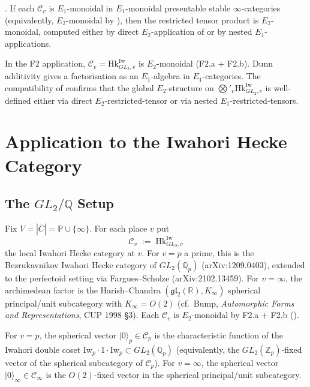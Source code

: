 \begin{corollary}[special case: \(E_{1}\otimes E_{1}=E_{2}\)]
\label{v4-arith:tate:cor:dunn-E1-E2}
\ClaimStatusProvedHere. If each \(\mathcal{C}_{v}\) is
\(E_{1}\)-monoidal in \(E_{1}\)-monoidal presentable stable
\(\infty\)-categories (equivalently,
\(E_{2}\)-monoidal by
), then the restricted
tensor product is \(E_{2}\)-monoidal, computed either by direct
\(E_{2}\)-application of  or by
nested \(E_{1}\)-applications.
\end{corollary}

\begin{remark}
\label{v4-arith:tate:rem:dunn-F2-role}
In the F2 application,
\(\mathcal{C}_{v}=\mathrm{Hk}^{\mathrm{Iw}}_{GL_{2},v}\) is
\(E_{2}\)-monoidal (F2.a + F2.b). Dunn additivity gives a
factorisation as an \(E_{1}\)-algebra in \(E_{1}\)-categories. The
compatibility of  confirms
that the global \(E_{2}\)-structure on
\(\bigotimes'_{v}\mathrm{Hk}^{\mathrm{Iw}}_{GL_{2},v}\) is
well-defined either via direct \(E_{2}\)-restricted-tensor or via
nested \(E_{1}\)-restricted-tensors.
\end{remark}

\section{Application to the Iwahori Hecke Category}
\label{v4-arith:tate:iwahori-application}

\subsection{The \(GL_{2}/\mathbb{Q}\) Setup}

\begin{setup}
\label{v4-arith:tate:setup:iwahori-Hecke-data}
Fix \(V=|\overline{C}|=\mathbb{P}\cup\{\infty\}\). For each place \(v\)
put
\[
\mathcal{C}_{v}\;:=\;\mathrm{Hk}^{\mathrm{Iw}}_{GL_{2},v}
\]
the local Iwahori Hecke category at \(v\). For \(v=p\) a prime, this is
the Bezrukavnikov Iwahori Hecke category of
\(GL_{2}(\mathbb{Q}_{p})\) (arXiv:1209.0403), extended to the
perfectoid setting via Fargues--Scholze (arXiv:2102.13459). For
\(v=\infty\), the archimedean factor is the Harish--Chandra
\((\mathfrak{gl}_{2}(\mathbb{R}),K_{\infty})\) spherical
principal/unit subcategory with \(K_{\infty}=O(2)\)
(cf.~Bump, \emph{Automorphic Forms and Representations}, CUP
1998 \S3). Each \(\mathcal{C}_{v}\) is \(E_{2}\)-monoidal by F2.a + F2.b
().

For \(v=p\), the spherical vector \(|0\rangle_{p}\in\mathcal{C}_{p}\) is
the characteristic function of the Iwahori double coset
\(\mathrm{Iw}_{p}\cdot 1\cdot\mathrm{Iw}_{p}\subset GL_{2}(\mathbb{Q}_{p})\)
(equivalently, the \(GL_{2}(\mathbb{Z}_{p})\)-fixed vector of the
spherical subcategory of \(\mathcal{C}_{p}\)). For \(v=\infty\), the
spherical vector \(|0\rangle_{\infty}\in\mathcal{C}_{\infty}\) is the
\(O(2)\)-fixed vector in the spherical principal/unit subcategory.
\end{setup}


